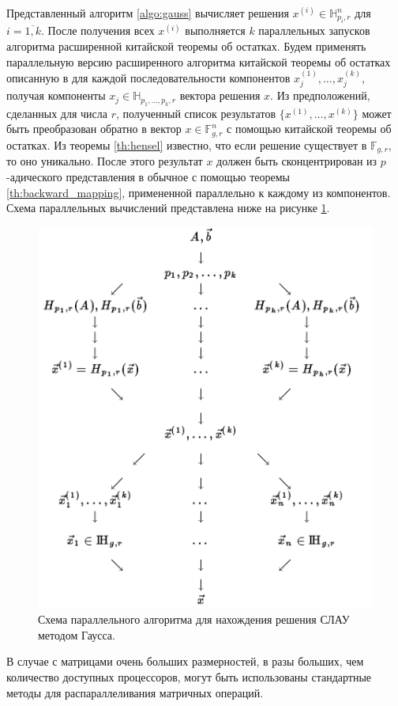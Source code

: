\documentclass[master, och, diploma, times]{sty/SCWorks}
\theoremstyle{plain}
\theoremstyle{definition}
\numberwithin{equation}{section}
\begin{document}
Представленный алгоритм \ref{algo:gauss} вычисляет решения $x^{(i)} \in \mathbb{H}_{p_i,r}^n$ для $i = \overline{1,k}$. После получения всех $x^{(i)}$ выполняется $k$ параллельных запусков алгоритма расширенной китайской теоремы об остатках. Будем применять параллельную версию расширенного алгоритма китайской теоремы об остатках описанную в \cite{bib:numbers:limongelli} для каждой последовательности компонентов $x_j^{(1)}, \dots, x_j^{(k)}$, получая компоненты $x_j \in \mathbb{H}_{p_1,\dots,p_k,r}$ вектора решения $x$.
Из предположений, сделанных для числа $r$, полученный список результатов $\{x^{(1)},\dots,x^{(k)}\}$ может быть преобразован обратно в вектор $x \in \mathbb{F}_{g,r}^n$ с помощью китайской теоремы об остатках. Из теоремы \ref{th:hensel} известно, что если решение существует в $\mathbb{F}_{g,r}$, то оно уникально.
После этого результат $x$ должен быть сконцентрирован из $p$-адического представления в обычное с помощью теоремы \ref{th:backward_mapping}, примененной параллельно к каждому из компонентов. Схема параллельных вычислений представлена ниже на рисунке \ref{img:multi:gauss}.

\begin{figure}[H]
\centerline{\includegraphics[width=0.7\linewidth]{images/multi/native.png}}
\caption{Схема параллельного алгоритма для нахождения решения СЛАУ методом Гаусса.}
\label{img:multi:gauss}
\end{figure}


В случае с матрицами очень больших размерностей, в разы больших, чем количество доступных процессоров, могут быть использованы стандартные методы для распараллеливания матричных операций.
\end{document}
